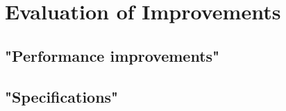 \section{Evaluation of Improvements}
	\subsection{"Performance improvements"}
	
	\subsection{"Specifications"}
	
	
